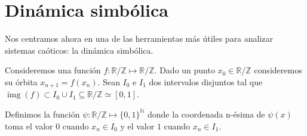 \documentclass[12pt,a4paper]{report}
\theoremstyle{definition}
\begin{document}
\section{Dinámica simbólica}\label{sec:symbolic}

Nos centramos ahora en una de las herramientas más útiles para analizar sistemas caóticos: la dinámica simbólica.

Consideremos una función $f : \mathbb{R}/\mathbb{Z} \mapsto \mathbb{R}/\mathbb{Z}$. Dado un punto $x_0 \in  \mathbb{R}/\mathbb{Z}$ consideremos su órbita $x_{n+1} = f(x_n)$. Sean $I_0$ e $I_1$ dos intervalos disjuntos tal que $\operatorname{img}(f) \subset I_0 \cup I_1 \subseteq \mathbb{R}/\mathbb{Z} \simeq [0,1]$.

Definimos la función $\psi : \mathbb{R}/\mathbb{Z} \mapsto \{ 0,1\}^{\mathbb{N}}$ donde la coordenada n-ésima de $\psi(x)$ toma el valor $0$ cuando $x_n \in I_0$ y el valor $1$ cuando $x_n \in I_1$.
\end{document}
